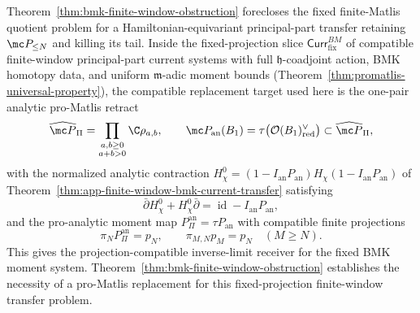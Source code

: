 \begin{cor}\label{cor:promatlis-retract-compatible-replacement}
  Theorem~\ref{thm:bmk-finite-window-obstruction} forecloses the fixed
  finite-Matlis quotient problem for a Hamiltonian-equivariant
  principal-part transfer retaining \(\mc P_{\le N}\) and killing its
  tail.  Inside the fixed-projection slice
  \(\mathsf{Curr}^{BM}_{\mathrm{fix}}\) of compatible
  finite-window principal-part current systems with full
  \(\mathfrak h\)-coadjoint action, BMK homotopy data, and uniform
  \(\mathfrak m\)-adic moment bounds
  (Theorem~\ref{thm:promatlis-universal-property}), the compatible
  replacement target used here is the one-pair analytic pro-Matlis
  retract
  \[
    \widehat{\mc P}_{\Pi}
      =\prod_{\substack{a,b\geq0\\a+b>0}}\C\rho_{a,b},
    \qquad
    \mc P_{\mathrm{an}}(B_1)
      =\tau\bigl(\mathcal O(B_1)^\vee_{\mathrm{red}}\bigr)
      \subset\widehat{\mc P}_{\Pi},
  \]
  with the normalized analytic contraction
  \(H_\chi^0=(1-I_{\mathrm{an}}P_{\mathrm{an}})H_\chi
  (1-I_{\mathrm{an}}P_{\mathrm{an}})\) of
  Theorem~\ref{thm:app-finite-window-bmk-current-transfer} satisfying
  \[
    \bar\partial H_\chi^0+H_\chi^0\bar\partial
      =\operatorname{id}-I_{\mathrm{an}}P_{\mathrm{an}},
  \]
  and the pro-analytic moment map
  \(P_{\Pi}^{\mathrm{an}}=\tau P_{\mathrm{an}}\) with compatible finite
  projections
  \[
    \pi_NP_{\Pi}^{\mathrm{an}}=p_N,
    \qquad
    \pi_{M,N}p_M=p_N
    \quad(M\geq N).
  \]
  This gives the projection-compatible inverse-limit receiver for the
  fixed BMK moment system.  Theorem~\ref{thm:bmk-finite-window-obstruction}
  establishes the necessity of a pro-Matlis replacement for this
  fixed-projection finite-window transfer problem.
\end{cor}

